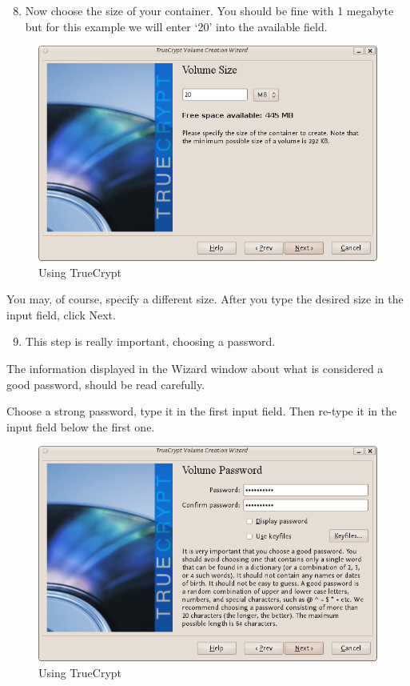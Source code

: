 \begin{enumerate}[1.]
\setcounter{enumi}{7}
\item
  Now choose the size of your container. You should be fine with 1
  megabyte but for this example we will enter `20' into the available
  field.
\end{enumerate}
\begin{figure}[htbp]
\centering
\includegraphics{using_tc_007.png}
\caption{Using TrueCrypt}
\end{figure}

You may, of course, specify a different size. After you type the desired
size in the input field, click Next.

\begin{enumerate}[1.]
\setcounter{enumi}{8}
\item
  This step is really important, choosing a password.
\end{enumerate}
The information displayed in the Wizard window about what is considered
a good password, should be read carefully.

Choose a strong password, type it in the first input field. Then re-type
it in the input field below the first one.

\begin{figure}[htbp]
\centering
\includegraphics{using_tc_008.png}
\caption{Using TrueCrypt}
\end{figure}

